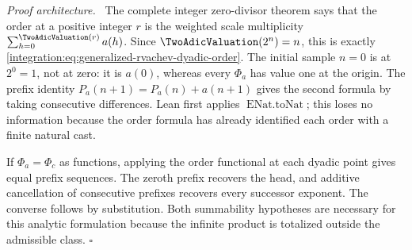 \documentclass[11pt,oneside]{article}
\theoremstyle{definition}
\theoremstyle{remark}
\newenvironment{proofidea}{\par\smallskip\noindent\textit{Proof architecture.}\ }{\hfill$\square$\par\smallskip}
\begin{document}
\begin{proofidea}
The complete integer zero-divisor theorem says that the order at a positive
integer \(r\) is the weighted scale multiplicity
\(\sum_{h=0}^{\TwoAdicValuation(r)}a(h)\).  Since \(\TwoAdicValuation(2^n)=n\), this is exactly
\eqref{integration:eq:generalized-rvachev-dyadic-order}.  The initial sample
\(n=0\) is at \(2^0=1\), not at zero: it is \(a(0)\), whereas every
\(\Phi_a\) has value one at the origin.  The prefix identity
\(P_a(n+1)=P_a(n)+a(n+1)\) gives the second formula by taking consecutive
differences.  Lean first applies \(\operatorname{ENat.toNat}\); this loses no
information because the order formula has already identified each order with
a finite natural cast.

If \(\Phi_a=\Phi_c\) as functions, applying the order functional at each
dyadic point gives equal prefix sequences.  The zeroth prefix recovers the
head, and additive cancellation of consecutive prefixes recovers every
successor exponent.  The converse follows by substitution.  Both summability
hypotheses are necessary for this analytic formulation because the infinite
product is totalized outside the admissible class.
\end{proofidea}
\end{document}
